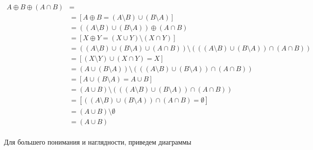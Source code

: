 \documentclass{article}
\begin{document}
\begin{equation} 
\begin{split}
A \oplus B \oplus (A \cap B) & =  \\
 & = [A \oplus B = (A \setminus B) \cup (B \setminus A)] \\
 & = ((A \setminus B) \cup (B \setminus A)) \oplus (A \cap B) \\
 & = [X \oplus Y = (X \cup Y) \setminus (X \cap Y)] \\
 & = ((A \setminus B) \cup (B \setminus A) \cup (A \cap B)) \setminus (((A \setminus B) \cup (B \setminus A)) \cap (A \cap B)) \\
 & = [(X \setminus Y) \cup (X \cap Y) = X ] \\
 & = (A \cup (B \setminus A)) \setminus (((A \setminus B) \cup (B \setminus A)) \cap (A \cap B)) \\
 & = [A \cup (B \setminus A) =  A \cup B] \\
 & = (A \cup B) \setminus (((A \setminus B) \cup (B \setminus A)) \cap (A \cap B)) \\
 & = [((A \setminus B) \cup (B \setminus A)) \cap (A \cap B) = \emptyset ] \\
 & = (A \cup B) \setminus \emptyset \\
 & = (A \cup B) \\
\end{split}
\end{equation}

Для большего понимания и наглядности, приведем диаграммы
\end{document}
